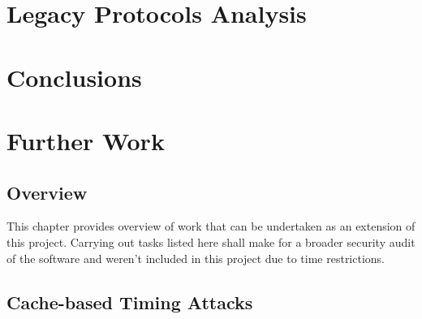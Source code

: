 \documentclass{report}
\begin{document}
\chapter{Legacy Protocols Analysis}
\chapter{Conclusions}
\chapter{Further Work}
\section{Overview}
This chapter provides overview of work that can be undertaken as an extension of this project. Carrying out tasks listed here shall make for a broader security audit of the software and weren't included in this project due to time restrictions.
\section{Cache-based Timing Attacks}
\end{document}
